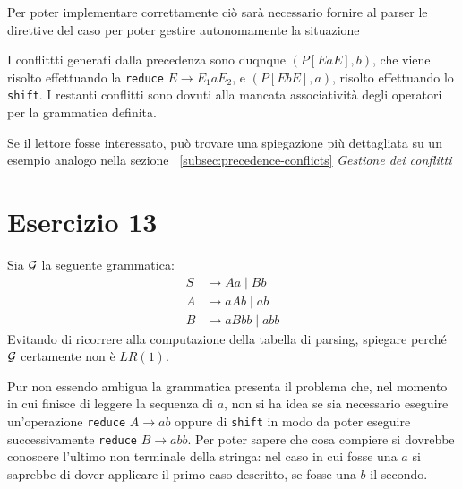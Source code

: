 \documentclass[class=book, crop=false, oneside, 12pt]{standalone}
\begin{document}
Per poter implementare correttamente ciò sarà necessario fornire al parser le direttive del caso per poter gestire autonomamente la situazione

I conflittti generati dalla precedenza sono duqnque \((P[EaE],b)\), che viene risolto effettuando la \texttt{reduce} \(E \to E_1 a E_2\), e \((P[EbE],a)\), risolto effettuando lo \texttt{shift}. I restanti conflitti sono dovuti alla mancata associatività degli operatori per la grammatica definita. 

Se il lettore fosse interessato, può trovare una spiegazione più dettagliata su un esempio analogo nella sezione ~\ref{subsec:precedence-conflicts} \emph{Gestione dei conflitti}

\section*{Esercizio 13}


Sia \(\mathcal{G}\) la seguente grammatica:
\begin{align*}
    S &\to Aa \mid Bb \\
    A &\to aAb \mid ab \\
    B &\to aBbb \mid abb
\end{align*}
Evitando  di  ricorrere  alla  computazione  della  tabella  di  parsing,  spiegare  perché \(\mathcal{G}\) certamente  non è \(LR(1)\).

Pur non essendo ambigua la grammatica presenta il problema che, nel momento in cui finisce di leggere la sequenza di \(a\), non si ha idea se sia necessario eseguire un'operazione \texttt{reduce} \(A \to ab\) oppure di \texttt{shift} in modo da poter eseguire successivamente \texttt{reduce} \(B \to abb\). Per poter sapere che cosa compiere si dovrebbe conoscere l'ultimo non terminale della stringa: nel caso in cui fosse una \(a\) si saprebbe di dover applicare il primo caso descritto, se fosse una \(b\) il secondo.
\end{document}
